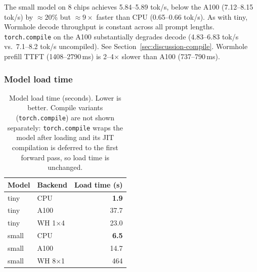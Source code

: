\begin{table}[h]
\caption{Prefill TTFT (ms), small model. Lower is better. $^*$See Table~\ref{tab:tiny-decode} footnote.}
\label{tab:small-prefill}
\end{table}

The small model on 8 chips achieves 5.84--5.89 tok/s, below the A100 (7.12--8.15 tok/s) by ${\approx}20\%$ but ${\approx}9\times$ faster than CPU (0.65--0.66 tok/s). As with tiny, Wormhole decode throughput is constant across all prompt lengths. \texttt{torch.compile} on the A100 substantially degrades decode (4.83--6.83 tok/s vs.\ 7.1--8.2 tok/s uncompiled). See Section~\ref{sec:discussion-compile}. Wormhole prefill TTFT (1408--2790\,ms) is 2--4$\times$ slower than A100 (737--790\,ms).

\subsubsection{Model load time}

\begin{table}[h]
\caption{Model load time (seconds). Lower is better. Compile variants (\texttt{torch.compile}) are not shown separately: \texttt{torch.compile} wraps the model after loading and its JIT compilation is deferred to the first forward pass, so load time is unchanged.}
\label{tab:load}
\begin{tabular}{llr}
\toprule
Model & Backend & Load time (s) \\
\midrule
tiny & CPU                & \textbf{1.9} \\
tiny & A100               & 37.7 \\
tiny & WH 1$\times$4      & 23.0 \\
\midrule
small & CPU               & \textbf{6.5} \\
small & A100              & 14.7 \\
small & WH 8$\times$1     & 464 \\
\bottomrule
\end{tabular}
\end{table}

